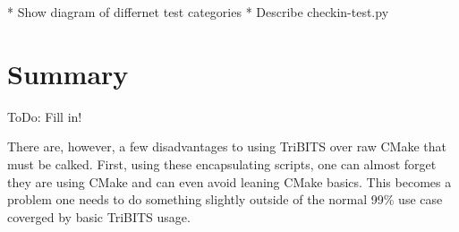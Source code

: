 \documentclass[10pt]{article}
\begin{document}
* Show diagram of differnet test categories
* Describe checkin-test.py


%
\section{Summary}
%

ToDo: Fill in!

There are, however, a few disadvantages to using TriBITS over raw CMake that must be calked.  First, using these encapsulating scripts, one can almost forget they are using CMake and can even avoid leaning CMake basics.  This becomes a problem one needs to do something slightly outside of the normal 99\% use case coverged by basic TriBITS usage.






\end{document}
